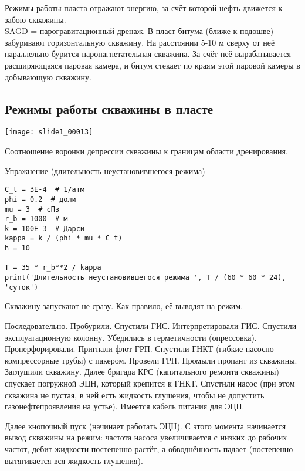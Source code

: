 \documentclass[main.tex]{subfiles}
\begin{document}
Режимы работы пласта отражают энергию, за счёт которой нефть движется к забою скважины.\\

SAGD = парогравитационный дренаж. В пласт битума (ближе к подошве) забуривают горизонтальную скважину. На расстоянии 5-10 м сверху от неё параллельно бурится паронагнетательная скважина. За счёт неё вырабатывается расширяющаяся паровая камера, и битум стекает по краям этой паровой камеры в добывающую скважину.


\subsection{Режимы работы скважины в пласте}
\texttt{[image: slide1\_00013]}





Соотношение воронки депрессии скважины к границам области дренирования.

Упражнение (длительность неустановившегося режима)

\begin{listing}[h]
\begin{verbatim}
C_t = 3E-4  # 1/атм
phi = 0.2  # доли
mu = 3  # сПз
r_b = 1000  # м
k = 100E-3  # Дарси
kappa = k / (phi * mu * C_t)
h = 10

T = 35 * r_b**2 / kappa
print('Длительность неустановившегося режима ', T / (60 * 60 * 24), 'суток')
\end{verbatim}
\end{listing}

Скважину запускают не сразу. Как правило, её выводят на режим.

Последовательно. Пробурили. Спустили ГИС. Интерпретировали ГИС. Спустили эксплуатационную колонну. Убедились в герметичности (опрессовка). Проперфорировали. Пригнали флот ГРП. Спустили ГНКТ (гибкие насосно-компрессорные трубы) с пакером. Провели ГРП. Промыли пропант из скважины. Заглушили скважину. Далее бригада КРС (капитального ремонта скважины) спускает погружной ЭЦН, который крепится к ГНКТ. Спустили насос (при этом скважина не пустая, в ней есть жидкость глушения, чтобы не допустить газонефтепроявления на устье). Имеется кабель питания для ЭЦН.

Далее кнопочный пуск (начинает работать ЭЦН). С этого момента начинается вывод скважины на режим: частота насоса увеличивается с низких до рабочих частот, дебит жидкости постепенно растёт, а обводнённость падает (постепенно вытягивается вся жидкость глушения).
\end{document}
